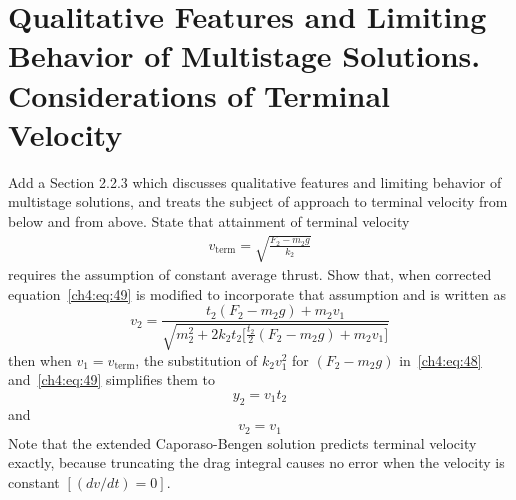 \section*{Qualitative Features and Limiting Behavior of Multistage Solutions.\\ Considerations of Terminal
Velocity}\label{supp:ch4-summary:terminal}

Add a Section 2.2.3 which discusses qualitative features and limiting behavior of multistage solutions, and
treats the subject of approach to terminal velocity from below and from above. State that attainment of
terminal velocity
\begin{gather*}
v_{\mathrm{term}} = \sqrt{\frac{F_2 - m_2g}{k_2}}
\end{gather*}
requires the assumption of constant average thrust. Show that, when corrected equation~\eqref{ch4:eq:49} is
modified to incorporate that assumption and is written as
\begin{equation*}
v_2 = \frac{t_2(F_2 - m_2g) + m_2v_1}{\sqrt{m_2^{2} + 2k_2t_2\bigl[\tfrac{t_2}{2}(F_2 - m_2g) + m_2v_1\bigr]}}
\end{equation*}
then when $v_1 = v_{\mathrm{term}}$, the substitution of $k_2v_1^{2}$ for $(F_2 - m_2g)$
in~\eqref{ch4:eq:48} and~\eqref{ch4:eq:49} simplifies them to
\begin{equation*}
y_2 = v_1t_2
\end{equation*}
and
\begin{equation*}
v_2 = v_1
\end{equation*}
Note that the extended Caporaso-Bengen solution predicts terminal velocity exactly, because truncating the
drag integral causes no error when the velocity is constant $[(dv/dt) = 0]$.

